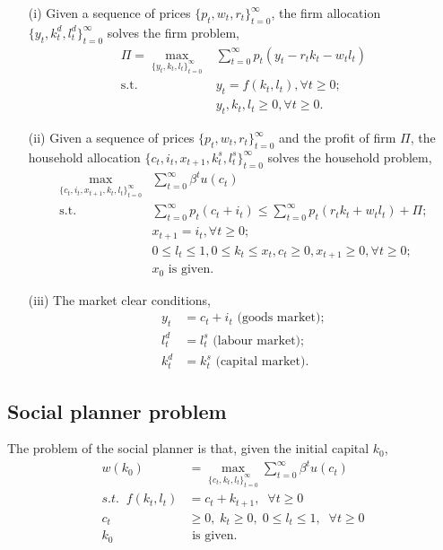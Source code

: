 \documentclass[12pt,notitlepage]{article}%
\numberwithin{equation}{section}
\begin{document}
			\begin{itemize}
			\item[(i)] Given a sequence of prices $\{p_t,w_t,r_t\}_{t=0}^{\infty}$, the firm allocation $\{y_t,k_t^d,l_t^d\}_{t=0}^{\infty}$ solves the firm problem,
			\begin{equation}
			\begin{split}
				\Pi = \max_{\{y_t,k_t,l_t\}_{t=0}^{\infty}}&\sum_{t=0}^{\infty}
				p_t(y_t-r_tk_t-w_tl_t)\\
				\text{s.t.  }&y_t=f(k_t,l_t), \forall t\geq 0;\\
				&y_t,k_t,l_t\geq 0, \forall t \geq 0.
			\end{split}
			\end{equation}
			
			\item[(ii)] Given a sequence of prices $\{p_t,w_t,r_t\}_{t=0}^{\infty}$ and the profit of firm $\Pi$, the household allocation $\{c_t,i_t,x_{t+1},k_t^s,l_t^s\}_{t=0}^{\infty}$ solves the household problem,
			\begin{equation}
			\begin{split}
			\max_{\{c_t,i_t,x_{t+1},k_t,l_t\}_{t=0}^{\infty}}&\sum_{t=0}^{\infty}
			\beta ^tu(c_t)\\
			\text{s.t.  }& \sum_{t=0}^{\infty}p_t(c_t+i_t)
			\leq\sum_{t=0}^{\infty}p_t(r_tk_t+w_tl_t)+\Pi;\\
			&x_{t+1}=i_t, \forall t\geq 0;\\
			&0\leq l_t\leq 1,0\leq k_t\leq x_t, c_t\geq 0, x_{t+1}\geq 0,\forall t \geq 0;\\
			&x_0 \text{ is given.}
			\end{split}
			\end{equation}
			
			\item[(iii)] The market clear conditions,
			\begin{equation*}
			\begin{split}
				y_t&=c_t+i_t	\text{	(goods market)};\\
				l_t^d&=l_t^s	\text{	(labour market)};\\
				k_t^d&=k_t^s 	\text{	(capital market)}.
			\end{split}
			\end{equation*}
			\end{itemize}

		\subsection{Social planner problem}
			The problem of the social planner is that, given the initial capital $k_0$,
			\begin{equation}\label{SPP1}
				\begin{split}
				w( k_0)&=\max_{\{c_t, k_t, l_t \}_{t=0}^{\infty}}
				\sum_{t=0}^{\infty}\beta^tu(c_t)\\
				s.t. \;\;f(k_t,l_t)&=c_t+k_{t+1}, \;\;\forall t\geq 0\\
				c_t&\geq0,\;k_t\geq0,\;0\leq l_t\leq 1,  \;\;\forall t\geq 0\\
				k_0&\text{ is given.}
				\end{split}
			\end{equation}
		
\end{document}
